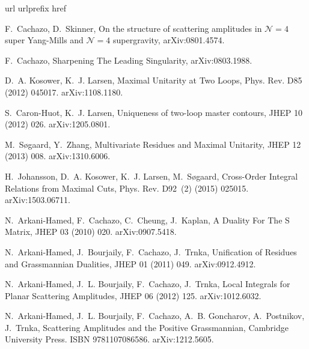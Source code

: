 \documentclass[dvipsnames,preprint,12pt,sort&compress]{elsarticle}
\begin{document}
\begin{thebibliography}{10}
\expandafter\ifx\csname url\endcsname\relax
  \def\url#1{\texttt{#1}}\fi
\expandafter\ifx\csname urlprefix\endcsname\relax\def\urlprefix{URL }\fi
\expandafter\ifx\csname href\endcsname\relax
  \def\href#1#2{#2} \def\path#1{#1}\fi

F.~Cachazo, D.~Skinner, {On the structure of scattering amplitudes in
  $\mathcal{N}=4$ super Yang-Mills and $\mathcal{N}=4$ supergravity, }\href
  {http://arxiv.org/abs/0801.4574} {\path{arXiv:0801.4574}}.

F.~Cachazo, {Sharpening The Leading Singularity, }\href
  {http://arxiv.org/abs/0803.1988} {\path{arXiv:0803.1988}}.

D.~A. Kosower, K.~J. Larsen, {Maximal Unitarity at Two Loops}, Phys. Rev. D85
  (2012) 045017.
\newblock \href {http://arxiv.org/abs/1108.1180} {\path{arXiv:1108.1180}}.

S.~Caron-Huot, K.~J. Larsen, {Uniqueness of two-loop master contours}, JHEP 10
  (2012) 026.
\newblock \href {http://arxiv.org/abs/1205.0801} {\path{arXiv:1205.0801}}.

M.~S{\o}gaard, Y.~Zhang, {Multivariate Residues and Maximal Unitarity}, JHEP 12
  (2013) 008.
\newblock \href {http://arxiv.org/abs/1310.6006} {\path{arXiv:1310.6006}}.

H.~Johansson, D.~A. Kosower, K.~J. Larsen, M.~S{\o}gaard, {Cross-Order Integral
  Relations from Maximal Cuts}, Phys. Rev. D92~(2) (2015) 025015.
\newblock \href {http://arxiv.org/abs/1503.06711} {\path{arXiv:1503.06711}}.

N.~Arkani-Hamed, F.~Cachazo, C.~Cheung, J.~Kaplan, {A Duality For The S
  Matrix}, JHEP 03 (2010) 020.
\newblock \href {http://arxiv.org/abs/0907.5418} {\path{arXiv:0907.5418}}.

N.~Arkani-Hamed, J.~Bourjaily, F.~Cachazo, J.~Trnka, {Unification of Residues
  and Grassmannian Dualities}, JHEP 01 (2011) 049.
\newblock \href {http://arxiv.org/abs/0912.4912} {\path{arXiv:0912.4912}}.

N.~Arkani-Hamed, J.~L. Bourjaily, F.~Cachazo, J.~Trnka, {Local Integrals for
  Planar Scattering Amplitudes}, JHEP 06 (2012) 125.
\newblock \href {http://arxiv.org/abs/1012.6032} {\path{arXiv:1012.6032}}.

N.~Arkani-Hamed, J.~L. Bourjaily, F.~Cachazo, A.~B. Goncharov, A.~Postnikov,
  J.~Trnka, {Scattering Amplitudes and the Positive Grassmannian}, Cambridge
  University Press. ISBN 9781107086586. arXiv:1212.5605.


\end{thebibliography}
\end{document}
